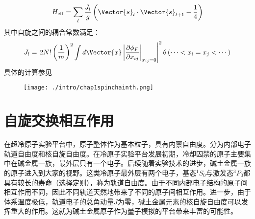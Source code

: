\begin{equation}
H_{\mathrm{eff}}=\sum_{l} \frac{J_{l}}{g}\left(\Vector{s}_{l} \cdot \Vector{s}_{l+1}-\frac{1}{4}\right)
\end{equation}
其中自旋之间的耦合常数满足：
\begin{equation}
J_{l}=\left.2 N !\left(\frac{1}{m}\right)^{2} \int d \Vector{x}\left|\frac{\partial \phi_{F}}{\partial x_{i j}}\right|_{x_{i j}=0}\right|^{2} \theta\left(\cdots<x_{i}=x_{j}<\cdots\right)
\end{equation}
具体的计算参见\cite{Guan2009exact,Santos2014spinchain,Yang2016effective}
\begin{figure}[!htbp]
    \centering
    \texttt{[image: ./intro/chap1spinchainth.png]}
    \label{spinchainth}
\end{figure}
\begin{comment}
基于上面介绍的量子少体研究进展，将有几个可扩展的方向，比如改变相互作用，偶极、库伦、以及自旋交换相互作用，这其中自旋交换相互作用将是下一章节要重点介绍的。
\end{comment}











\section{自旋交换相互作用}\label{sec:spin-exchange}
在超冷原子实验平台中，原子整体作为基本粒子，具有内禀自由度。分为内部电子轨道自由度和核自旋自由度。在冷原子实验平台发展初期，冷却囚禁的原子主要集中在碱金属一族，最外层只有一个电子。后续随着实验技术的进步，碱土金属一族的原子进入到大家的视野。这类冷原子最外层有两个电子，基态${}^1S_0$与激发态${}^3P_0$都具有较长的寿命（选择定则），称为轨道自由度。由于不同内部电子结构的原子间相互作用不同，因此不同轨道天然地带来了不同的原子间相互作用。进一步，由于体系温度极低，轨道电子的总角动量$J$为零，碱土金属元素的核自旋自由度可以发挥重大的作用。这就为碱土金属原子作为量子模拟的平台带来丰富的可能性。

